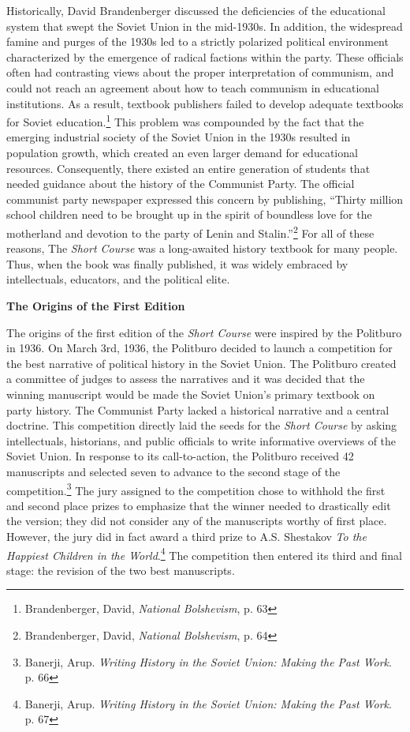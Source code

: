 \documentclass[a4paper, twocolumn]{article}
\begin{document}
Historically, David Brandenberger discussed the deficiencies of the
educational system that swept the Soviet Union in the mid-1930s. In
addition, the widespread famine and purges of the 1930s led to a
strictly polarized political environment characterized by the
emergence of radical factions within the party. These officials often
had contrasting views about the proper interpretation of communism, and
could not reach an agreement about how to teach communism in
educational institutions. As a result, textbook publishers failed to
develop adequate textbooks for Soviet education.\footnote{ Brandenberger, David, \emph{National Bolshevism}, p. 63} This problem was
compounded by the fact that the emerging industrial society of the
Soviet Union in the 1930s resulted in population growth, which created
an even larger demand for educational resources. Consequently,
there existed an entire generation of students that needed guidance
about the history of the Communist Party. The official communist party
newspaper expressed this concern by publishing, ``Thirty million
school children need to be brought up in the spirit of boundless love
for the motherland and devotion to the party of Lenin and Stalin.''\footnote{ Brandenberger, David, \emph{National Bolshevism}, p. 64}
For all of these reasons, The \emph{Short Course} was a long-awaited history
textbook for many people. Thus, when the book was finally published,
it was widely embraced by intellectuals, educators, and the political
elite.


\begin{center}\textbf{The Origins of the First Edition}\end{center}

The origins of the first edition of the \emph{Short Course} were inspired by
the Politburo in 1936. On March 3rd, 1936, the Politburo decided to
launch a competition for the best narrative of political history in
the Soviet Union. The Politburo created a committee of judges to
assess the narratives and it was decided that the winning manuscript
would be made the Soviet Union's primary textbook on party
history. The Communist Party lacked a historical narrative and a central
doctrine.
  This competition directly laid the seeds for the \emph{Short Course} by
  asking intellectuals, historians, and public officials to write
  informative overviews of the Soviet Union. In response to its call-to-action, the Politburo received 42 manuscripts and selected seven
  to advance to the second stage of the competition.\footnote{Banerji, Arup. \emph{Writing History in the Soviet Union: Making the Past Work}. p. 66} The jury
  assigned to the competition chose to withhold the first and second
  place prizes to emphasize that the winner needed to drastically edit
  the version; they did not consider any of the manuscripts worthy of
  first place.  However, the jury did in fact award a third prize to
  A.S. Shestakov \emph{To the Happiest Children in the World}.\footnote{Banerji, Arup. \emph{Writing History in the Soviet Union: Making the Past Work}. p. 67} The
  competition then entered its third and final stage: the revision of
  the two best manuscripts.
\end{document}
